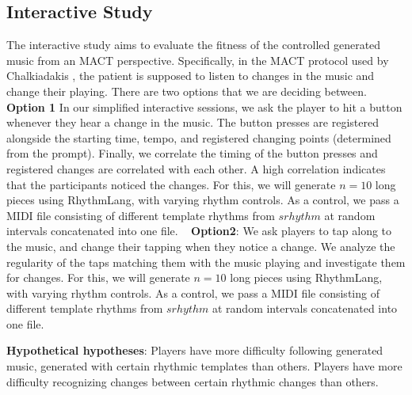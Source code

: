 \subsection{Interactive Study}
The interactive study aims to evaluate the fitness of the controlled generated music from an MACT perspective. Specifically, in the MACT protocol used by Chalkiadakis \cite{Chalkiadakis_2022}, the patient is supposed to listen to changes in the music and change their playing. There are two options that we are deciding between.
\textbf{Option 1}
In our simplified interactive sessions, we ask the player to hit a button whenever they hear a change in the music. The button presses are registered alongside the starting time, tempo, and registered changing points (determined from the prompt). Finally, we correlate the timing of the button presses and registered changes are correlated with each other. A high correlation indicates that the participants noticed the changes. 
For this, we will generate $n=10$ long pieces using RhythmLang, with varying rhythm controls. As a control, we pass a MIDI file consisting of different template rhythms from $srhythm$ at random intervals concatenated into one file.   
\textbf{Option2}: We ask players to tap along to the music, and change their tapping when they notice a change. We analyze the regularity of the taps matching them with the music playing and investigate them for changes. 
For this, we will generate $n=10$ long pieces using RhythmLang, with varying rhythm controls. As a control, we pass a MIDI file consisting of different template rhythms from $srhythm$ at random intervals concatenated into one file.   

\textbf{Hypothetical hypotheses}: Players have more difficulty following generated music, generated with certain rhythmic templates than others. 
Players have more difficulty recognizing changes between certain rhythmic changes than others. 

